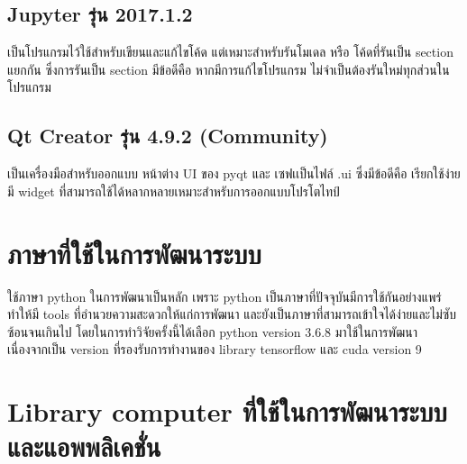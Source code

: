 \subsection*{Jupyter รุ่น 2017.1.2} เป็นโปรแกรมไว้ใช้สำหรับเขียนและแก้ไขโค้ด แต่เหมาะสำหรับรันโมเดล หรือ โค้ดที่รันเป็น section แยกกัน ซึ่งการรันเป็น section มีข้อดีคือ หากมีการแก้ไขโปรแกรม ไม่จำเป็นต้องรันใหม่ทุกส่วนในโปรแกรม

\subsection*{Qt Creator รุ่น 4.9.2 (Community)}
เป็นเครื่องมือสำหรับออกแบบ หน้าต่าง UI ของ pyqt และ เซฟเเป็นไฟล์ .ui ซึ่งมีข้อดีคือ เรียกใช้ง่าย มี  widget ที่สามารถใช้ได้หลากหลายเหมาะสำหรับการออกแบบโปรโตไทป์


\clearpage
\section{ภาษาที่ใช้ในการพัฒนาระบบ} 
	ใช้ภาษา python ในการพัฒนาเป็นหลัก เพราะ python เป็นภาษาที่ปัจจุบันมีการใช้กันอย่างแพร่ทำให้มี tools ที่อำนวยความสะดวกให้แก่การพัฒนา และยังเป็นภาษาที่สามารถเข้าใจได้ง่ายและไม่ซับซ้อนจนเกินไป โดยในการทำวิจัยครั้งนี้ได้เลือก python version 3.6.8 มาใช้ในการพัฒนา เนื่องจากเป็น version ที่รองรับการทำงานของ library tensorflow และ cuda version 9

\vspace{3mm}
\section{Library computer ที่ใช้ในการพัฒนาระบบและแอพพลิเคชั่น} 

